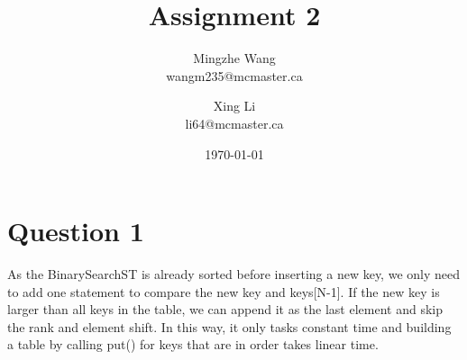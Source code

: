 \documentclass[11pt]{article}
\author{Mingzhe Wang\\wangm235@mcmaster.ca
\and Xing Li\\li64@mcmaster.ca}
\date{\today}
\title{Assignment 2}
\begin{document}
\maketitle
\tableofcontents

\newpage
\section{Question 1}

As the BinarySearchST is already sorted before inserting a new key, we only need to add one statement to compare the new key and keys[N-1]. If the new key is larger than all keys in the table, we can append it as the last element and skip the rank and element shift. In this way, it only tasks constant time and building a table by calling put() for keys that are in order takes linear time.
\end{document}
